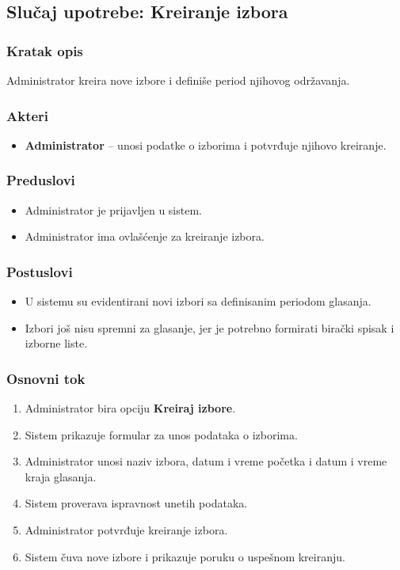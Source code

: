 \subsection{Slučaj upotrebe: Kreiranje izbora}

\subsubsection*{Kratak opis}
Administrator kreira nove izbore i definiše period njihovog održavanja.

\subsubsection*{Akteri}
\begin{itemize}
    \item \textbf{Administrator} -- unosi podatke o izborima i potvrđuje njihovo kreiranje.
\end{itemize}

\subsubsection*{Preduslovi}
\begin{itemize}
    \item Administrator je prijavljen u sistem.
    \item Administrator ima ovlašćenje za kreiranje izbora.
\end{itemize}

\subsubsection*{Postuslovi}
\begin{itemize}
    \item U sistemu su evidentirani novi izbori sa definisanim periodom glasanja.
    \item Izbori još nisu spremni za glasanje, jer je potrebno formirati birački spisak i izborne liste.
\end{itemize}

\subsubsection*{Osnovni tok}
\begin{enumerate}
    \item Administrator bira opciju \textbf{Kreiraj izbore}.
    \item Sistem prikazuje formular za unos podataka o izborima.
    \item Administrator unosi naziv izbora, datum i vreme početka i datum i vreme kraja glasanja.
    \item Sistem proverava ispravnost unetih podataka.
    \item Administrator potvrđuje kreiranje izbora.
    \item Sistem čuva nove izbore i prikazuje poruku o uspešnom kreiranju.
\end{enumerate}

